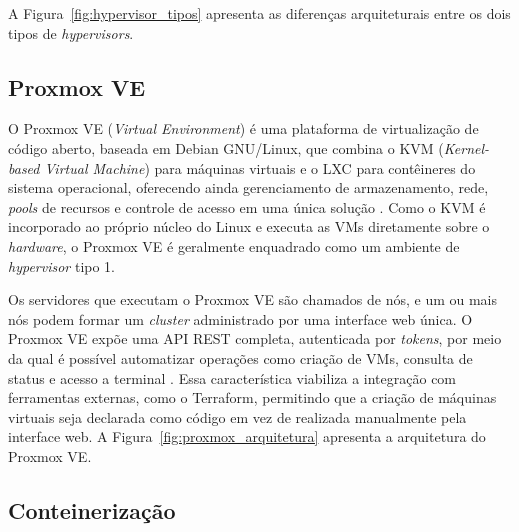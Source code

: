 \par A Figura~\ref{fig:hypervisor_tipos} apresenta as diferenças arquiteturais entre os dois tipos de \textit{hypervisors}.


\subsection{Proxmox VE}
\label{sec:proxmox}

O Proxmox VE (\textit{Virtual Environment}) é uma plataforma de virtualização de código aberto, baseada em Debian GNU/Linux, que combina o KVM (\textit{Kernel-based Virtual Machine}) para máquinas virtuais e o LXC para contêineres do sistema operacional, oferecendo ainda gerenciamento de armazenamento, rede, \textit{pools} de recursos e controle de acesso em uma única solução \cite{proxmoxDocs:online}. Como o KVM é incorporado ao próprio núcleo do Linux e executa as VMs diretamente sobre o \textit{hardware}, o Proxmox VE é geralmente enquadrado como um ambiente de \textit{hypervisor} tipo 1.\\

\par Os servidores que executam o Proxmox VE são chamados de nós, e um ou mais nós podem formar um \textit{cluster} administrado por uma interface web única. O Proxmox VE expõe uma API REST completa, autenticada por \textit{tokens}, por meio da qual é possível automatizar operações como criação de VMs, consulta de status e acesso a terminal \cite{proxmoxDocs:online}. Essa característica viabiliza a integração com ferramentas externas, como o Terraform, permitindo que a criação de máquinas virtuais seja declarada como código em vez de realizada manualmente pela interface web. A Figura~\ref{fig:proxmox_arquitetura} apresenta a arquitetura do Proxmox VE.

\subsection{Conteinerização}
\label{sec:conteinerizacao}

